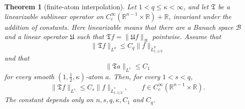 \documentclass[10pt,a4paper]{amsart}
\numberwithin{equation}{section}
\newcommand{\R}{\mathbb R}
\newtheorem{theorem}[equation]{Theorem}
\begin{document}
\begin{theorem}[finite-atom interpolation]\label{T.finiteinterp}
Let $1<q\le\kappa<\infty$, and let $\mathfrak T$ be a linearizable sublinear
operator on $C_c^\infty(\R^{n-1}\times\R)+\R$, invariant under the addition
of constants. Here linearizable means that there are a Banach space
$\mathcal B$ and a linear operator $\mathfrak U$ such that
$\mathfrak Tf=\|\mathfrak Uf\|_{\mathcal B}$ pointwise. Assume that
\[
 \|\mathfrak Tf\|_{L^q}\le C_q\|f\|_{\dot L^q_{1,1/2}}
\]
and that
\[
 \|\mathfrak Ta\|_{L^1}\le C_1
\]
for every smooth $(1,\tfrac12,\kappa)$-atom $a$. Then, for every $1<s<q$,
\begin{equation}\label{E.finiteinterp}
 \|\mathfrak Tf\|_{L^s}\le C_s\|f\|_{\dot L^s_{1,1/2}},
 \qquad f\in C_c^\infty(\R^{n-1}\times\R).
\end{equation}
The constant depends only on $n,s,q,\kappa,C_1$ and $C_q$.
\end{theorem}
\end{document}
